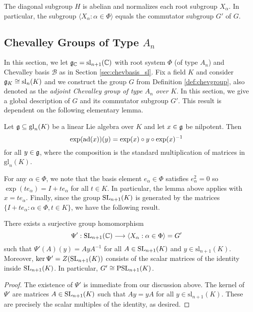 \begin{cor}
    The diagonal subgroup $H$ is abelian and normalizes each root subgroup $X_\alpha$. In particular, the subgroup $\langle X_\alpha:\alpha\in\Phi\rangle$ equals the commutator subgroup $G'$ of $G$.
\end{cor}

\subsection{Chevalley Groups of Type \texorpdfstring{$A_n$}{PDFstring}}

In this section, we let $\mathfrak{g}_{\mathbb{C}}=\mathrm{sl}_{n+1}(\mathbb{C})$ with root system $\Phi$ (of type $A_n$) and Chevalley basis $\mathcal{B}$ as in Section \ref{sec:chevbasis_sl}. Fix a field $K$ and consider $\mathfrak{g}_K\cong\mathrm{sl}_n(K)$ and we construct the group $G$ from Definition \ref{def:chevgroup}, also denoted as the \textit{adjoint Chevalley group of type $A_n$ over $K$}. In this section, we give a global description of $G$ and its commutator subgroup $G'$. This result is dependent on the following elementary lemma.

\begin{lemma}\label{lem:identityexp}
    Let $\mathfrak{g}\subseteq\mathrm{gl}_n(K)$ be a linear Lie algebra over $K$ and let $x\in\mathfrak{g}$ be nilpotent. Then 
    $$\exp(\mathrm{ad}(x))(y)=\exp(x)\circ y\circ \exp(x)^{-1}$$
    for all $y\in\mathfrak{g}$, where the composition is the standard multiplication of matrices in $\mathrm{gl}_n(K)$.
\end{lemma}

For any $\alpha\in\Phi$, we note that the basis element $e_\alpha\in\Phi$ satisfies $e_\alpha^2=0$ so $\exp(t e_\alpha)=I+t e_\alpha$ for all $t\in K$. In particular, the lemma above applies with $x=t e_\alpha$. Finally, since the group $\mathrm{SL}_{n+1}(K)$ is generated by the matrices $\{I+t e_\alpha:\alpha\in\Phi, t\in K\}$, we have the following result.

\begin{proposition}
    There exists a surjective group homomorphism 
    $$\Psi':\mathrm{SL}_{n+1}(\mathbb{C})\longrightarrow\langle X_\alpha:\alpha\in\Phi\rangle=G'$$
    such that $\Psi'(A)(y)=AyA^{-1}$ for all $A\in\mathrm{SL}_{n+1}(K)$ and $y\in\mathrm{sl}_{n+1}(K)$. Moreover, $\ker\Psi'=Z(\mathrm{SL}_{n+1}(K))$ consists of the scalar matrices of the identity inside $\mathrm{SL}_{n+1}(K)$. In particular, $G'\cong\mathrm{PSL}_{n+1}(K)$.
\end{proposition}
\begin{proof}
    The existence of $\Psi'$ is immediate from our discussion above. The kernel of $\Psi'$ are matrices $A\in\mathrm{SL}_{n+1}(K)$ such that $Ay=yA$ for all $y\in\mathrm{sl}_{n+1}(K)$. These are precisely the scalar multiples of the identity, as desired.
\end{proof}


